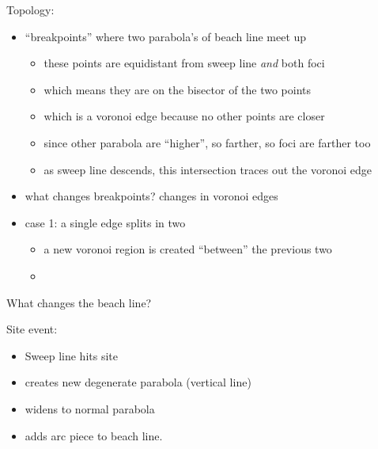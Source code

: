 \documentclass{article}
\begin{document}
Topology:
\begin{itemize}
\item ``breakpoints'' where two parabola's of beach line meet up
\begin{itemize}
\item these points are equidistant from sweep line \emph{and} both foci
\item which means they are on the bisector of the two points 
\item which is a voronoi edge because no other points are closer
\item since other parabola are ``higher'', so farther, so foci are farther too
\item as sweep line descends, this intersection traces out the voronoi
  edge
\end{itemize}
\item what changes breakpoints?  changes in voronoi edges
\item case 1: a single edge splits in two
\begin{itemize}
\item a new voronoi region is created ``between'' the previous two
\item 
\end{itemize}
\end{itemize}

What changes the beach line?

Site event:
\begin{itemize}
\item Sweep line hits site
\item creates new degenerate parabola (vertical line)
\item widens to normal parabola
\item adds arc piece to beach line.
\end{itemize}
\end{document}
